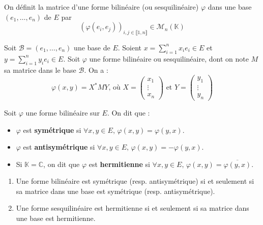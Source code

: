 	\begin{definition}
		On définit la matrice d'une forme bilinéaire (ou sesquilinéaire) $\varphi$ dans une base $(e_1, \dots, e_n)$ de $E$ par
		\[ (\varphi(e_i, e_j))_{i, j \in \llbracket 1, n \rrbracket} \in \mathcal{M}_n(\mathbb{K}) \]
	\end{definition}
	
	\begin{remark}
		Soit $\mathcal{B} = (e_1, \dots, e_n)$ une base de $E$. Soient $x = \sum_{i=1}^{n} x_i e_i \in E$ et $y = \sum_{i=1}^{n} y_i e_i \in E$. Soit $\varphi$ une forme bilinéaire ou sesquilinéaire, dont on note $M$ sa matrice dans le base $\mathcal{B}$. On a :
		\[ \varphi(x,y) = X^* M Y \text{, où } X = \begin{pmatrix} x_1 \\ \vdots \\ x_n \end{pmatrix} \text{ et } Y = \begin{pmatrix} y_1 \\ \vdots \\ y_n \end{pmatrix} \]
	\end{remark}
	
	\begin{definition}
		Soit $\varphi$ une forme bilinéaire sur $E$. On dit que :
		\begin{itemize}
			\item $\varphi$ est \textbf{symétrique} si $\forall x, y \in E, \, \varphi(x,y) = \varphi(y,x)$.
			\item $\varphi$ est \textbf{antisymétrique} si $\forall x, y \in E, \, \varphi(x,y) = -\varphi(y,x)$.
			\item Si $\mathbb{K} = \mathbb{C}$, on dit que $\varphi$ est \textbf{hermitienne} si $\forall x, y \in E, \, \varphi(x,y) = \overline{\varphi(y,x)}$.
		\end{itemize}
	\end{definition}
	
	\begin{proposition}
		\begin{enumerate}[label=(\roman*)]
			\item Une forme bilinéaire est symétrique (resp. antisymétrique) si et seulement si sa matrice dans une base est symétrique (resp. antisymétrique).
			\item Une forme sesquilinéaire est hermitienne si et seulement si sa matrice dans une base est hermitienne.
		\end{enumerate}
	\end{proposition}
	
